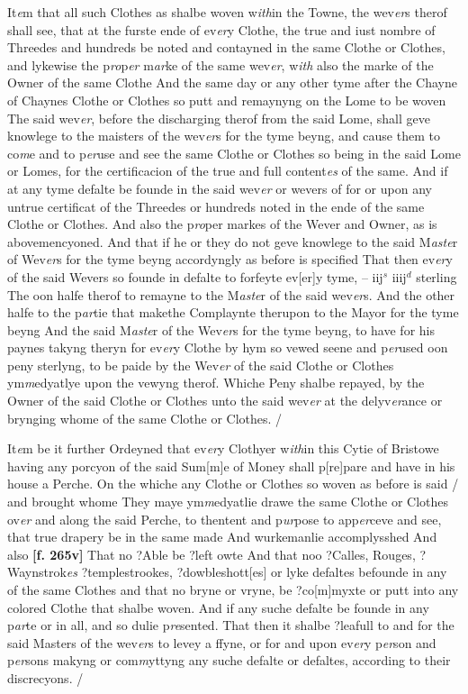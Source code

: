 \documentclass[a4paper,12pt]{article}
\begin{document}
It\textit{e}m that all such Clothes as shalbe woven w\textit{ith}in the Towne, the wev\textit{er}s therof shall see, that at the furste ende of ev\textit{er}y Clothe, the true and iust nombre of Threedes and hundreds be noted and contayned in the same Clothe or Clothes, and lykewise the p\textit{ro}p\textit{er} m\textit{ar}ke of the same wev\textit{er}, w\textit{ith} also the marke of the Owner of the same Clothe And the same day or any other tyme after the Chayne of Chaynes Clothe or Clothes so putt and remaynyng on the Lome to be woven The said wev\textit{er}, before the discharging therof from the said Lome, shall geve knowlege to the maisters of the wev\textit{er}s for the tyme beyng, and cause them to co\textit{m}e and to p\textit{er}use and see the same Clothe or Clothes so being in the said Lome or Lomes, for the certificacion of the true and full content\textit{es} of the same. And if at any tyme defalte be founde in the said wev\textit{er} or wevers of for or upon any untrue certificat of the Threedes or hundreds noted in the ende of the same Clothe or Clothes. And also the p\textit{ro}per markes of the Wever and Owner, as is abovemencyoned. And that if he or they do not geve knowlege to the said M\textit{aste}r of Wev\textit{er}s for the tyme beyng accordyngly as before is specified  That then ev\textit{er}y of the said Wevers so founde in defalte to forfeyte ev[er]y tyme, -- iij$^{s}$ iiij$^{d}$ sterling  The oon halfe therof to remayne to the M\textit{aste}r of the said wev\textit{er}s. And the other halfe to the p\textit{ar}tie that makethe Complaynte therupon to the Mayor for the tyme beyng And the said M\textit{aste}r of the Wev\textit{er}s for the tyme beyng, to have for his paynes takyng theryn for ev\textit{er}y Clothe by hym so vewed seene and p\textit{er}used oon peny sterlyng, to be paide by the Wev\textit{er} of the said Clothe or Clothes ym\textit{m}edyatlye upon the vewyng therof. Whiche Peny shalbe repayed, by the Owner of the said Clothe or Clothes unto the said wev\textit{er} at the delyv\textit{er}ance or brynging whome of the same Clothe or Clothes. /

It\textit{e}m be it further Ordeyned that ev\textit{er}y Clothyer w\textit{ith}in this Cytie of Bristowe having any porcyon of the said Sum[m]e of Money shall p[re]pare and have in his house a Perche. On the whiche any Clothe or Clothes so woven as before is said / and brought whome They maye ym\textit{m}edyatlie drawe the same Clothe or Clothes ov\textit{er} and along the said Perche, to thentent and p\textit{ur}pose to app\textit{er}ceve and see, that true drapery be in the same made And wurkemanlie accomplysshed And also \textbf{[f. 265v]} That no ?Able be ?left owte And that noo ?Calles, Rouges, ?Waynstrok\textit{es} ?templestrookes, ?dowbleshott[es] or lyke defaltes befounde in any of the same Clothes and that no bryne or vryne, be ?co[m]myxte or putt into any colored Clothe that shalbe woven. And if any suche defalte be founde in any p\textit{ar}te or in all, and so dulie p\textit{re}sented. That then it shalbe ?leafull to and for the said Masters of the wev\textit{er}s to levey a ffyne, or for and upon ev\textit{er}y p\textit{er}son and p\textit{er}sons makyng or com\textit{m}yttyng any suche defalte or defaltes, according to their discrecyons. /
\end{document}
